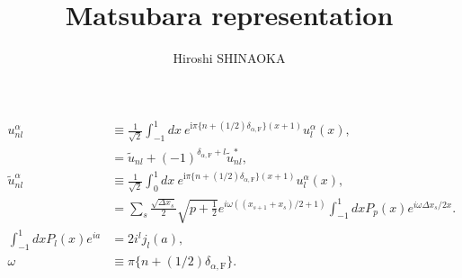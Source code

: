 \documentclass[disablejfam,12pt]{article}
\author{Hiroshi SHINAOKA}
\newcommand{\mathi}{\ensuremath{\mathrm{i}}}
\def\deltaF{\delta_{\alpha, \mathrm{F}}}
\begin{document}
\title{Matsubara representation}
\maketitle
\thispagestyle{empty}
\begin{align}
	u_{nl}^\alpha &\equiv \frac{1}{\sqrt{2}} \int_{-1}^{1} d x~e^{\mathi \pi \{n+(1/2)\deltaF\}(x+1)} u^\alpha_l(x),\label{eq:unl}\\
	&= \tilde{u}_{nl} + (-1)^{\deltaF+ l}\tilde{u}_{nl}^*, \\
	\tilde{u}_{nl}^\alpha &\equiv \frac{1}{\sqrt{2}} \int_{0}^{1} d x~e^{\mathi \pi \{n+(1/2)\deltaF\}(x+1)} u^\alpha_l(x),\\
	&= \sum_s  \frac{\sqrt{\Delta x_s}}{2} \sqrt{p+\frac{1}{2}}e^{i\omega((x_{s+1}+x_s)/2+1)} \int_{-1}^1 dxP_p(x)e^{i\omega \Delta x_s/2 x}.\\
	\int_{-1}^1 dx P_l(x)e^{ia} &= 2i^l j_l(a),\\
        \omega &\equiv \pi \{n+(1/2)\deltaF\}.
\end{align}
\end{document}
